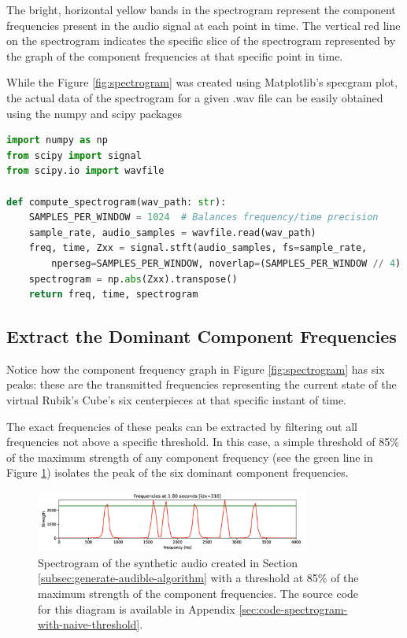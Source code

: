 The bright, horizontal yellow bands in the spectrogram represent the component frequencies present in the audio signal at each point in time.
The vertical red line on the spectrogram indicates the specific slice of the spectrogram represented by the graph of the component frequencies at that specific point in time.

While the Figure \ref{fig:spectrogram} was created using Matplotlib's specgram plot, the actual data of the spectrogram for a given .wav file can be easily obtained using the numpy and scipy packages

\begin{lstlisting}[language=Python]
import numpy as np
from scipy import signal
from scipy.io import wavfile

def compute_spectrogram(wav_path: str):
    SAMPLES_PER_WINDOW = 1024  # Balances frequency/time precision
    sample_rate, audio_samples = wavfile.read(wav_path)
    freq, time, Zxx = signal.stft(audio_samples, fs=sample_rate,
        nperseg=SAMPLES_PER_WINDOW, noverlap=(SAMPLES_PER_WINDOW // 4) * 3)
    spectrogram = np.abs(Zxx).transpose()
    return freq, time, spectrogram
\end{lstlisting}

\newpage
\subsection{Extract the Dominant Component Frequencies}
\label{subsec:extract-dominant-freqs}
Notice how the component frequency graph in Figure \ref{fig:spectrogram} has six peaks: these are the transmitted frequencies representing the current state of the virtual Rubik's Cube's six centerpieces at that specific instant of time.

The exact frequencies of these peaks can be extracted by filtering out all frequencies not above a specific threshold.
In this case, a simple threshold of 85\% of the maximum strength of any component frequency (see the green line in Figure \ref{fig:spectrogram-with-naive-threshold}) isolates the peak of the six dominant component frequencies.

\begin{figure}[h]
    \centering
    \includegraphics[width=0.8\textwidth]{Figures/5 Algorithm Design/threshold.png}
    \caption{Spectrogram of the synthetic audio created in Section \ref{subsec:generate-audible-algorithm} with a threshold at 85\% of the maximum strength of the component frequencies. The source code for this diagram is available in Appendix \ref{sec:code-spectrogram-with-naive-threshold}.}
    \label{fig:spectrogram-with-naive-threshold}
\end{figure}

